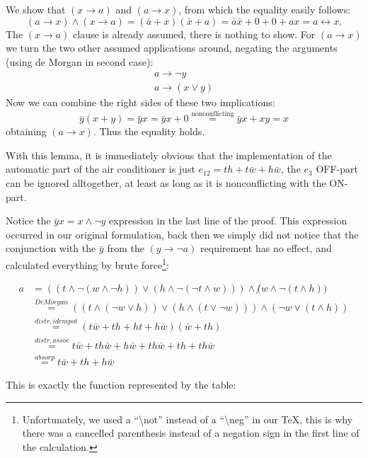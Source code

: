 \documentclass[10pt,a4paper]{scrartcl}
\renewcommand{\implies}{\rightarrow}
\begin{document}
 We show that $(x \implies a)$ and $(a \implies x)$, from which the
equality easily follows: 
\[
  (a \implies x) \wedge (x \implies a) = (\bar a + x)(\bar x + a) = \bar a \bar x + 0 + 0 + a x = 
  a \leftrightarrow x.
\]
The $(x \implies a)$ clause is already assumed, there is nothing to show.
For $(a \implies x)$ we turn the two other assumed applications around, 
negating the arguments (using de Morgan in second case):
\begin{align*}
  a \implies \neg y \\
  a \implies (x \vee y)
\end{align*}
Now we can combine the right sides of these two implications:
\[
  \bar y (x + y) = \bar y x = \bar y x + 0 
  \overset{\textrm{nonconflicting}}=
  \bar y x + x y = x
\]
obtaining $(a \implies x)$. Thus the equality holds.

With this lemma, 
it is immediately obvious that the implementation of the automatic part
of the air conditioner is just $e_{12} = t h + t\bar w + h \bar w$, the
$e_3$ OFF-part can be ignored alltogether, 
at least as long as it is nonconflicting with the ON-part.

Notice the $\bar y x = x\wedge\neg y$ expression in the last line of the proof.
This expression occurred in our original formulation, 
back then we simply did not notice that the conjunction with the
$\bar y$ from the $(y \implies \neg a)$ requirement has no effect, and calculated 
everything by brute force\footnote[1]{
  Unfortunately, we used a ``\textbackslash not'' instead of a ``\textbackslash neg'' in our TeX, 
  this is why there was a cancelled parenthesis instead of a negation sign in the first line of
  the calculation.
}:

\begin{align*}
a &= 
  ((t \wedge \neg (w \wedge \neg h)) \vee (h \wedge \neg (\neg t \wedge w))) 
  \wedge 
  \not (w \wedge \neg (t \wedge h)) \\
  &\overset{De Morgan}=
  ((t \wedge (\neg w \vee h)) \vee (h \wedge (t \vee \neg w))) \wedge (\neg w \vee (t \wedge h)) \\
  &\overset{distr, idempot}=
  (t\bar w + th + ht + h \bar w)(\bar w + th) \\
  &\overset{distr, assoc}=
  t\bar w + th\bar w + h\bar w + th\bar w + th + th \bar w \\
  &\overset{absorp}=
  t\bar w + th + h\bar w
\end{align*}

This is exactly the function represented by the table:
\end{document}
